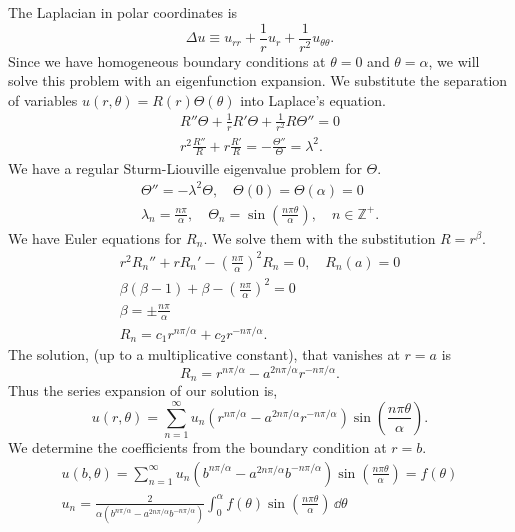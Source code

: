 {%
\begin{Solution}
  \label{solution harmonic sector inhomogeneous bc}
  The Laplacian in polar coordinates is
  \[
  \Delta u \equiv u_{r r} + \frac{1}{r} u_r + \frac{1}{r^2} u_{\theta\theta}.
  \]
  Since we have homogeneous boundary conditions at $\theta = 0$ and 
  $\theta = \alpha$, we will solve this problem with an eigenfunction 
  expansion.  We substitute the separation of variables
  $u(r,\theta) = R(r) \Theta(\theta)$ into Laplace's equation.
  \begin{gather*}
    R'' \Theta + \frac{1}{r} R' \Theta + \frac{1}{r^2} R \Theta'' = 0 \\
    r^2 \frac{R''}{R} + r \frac{R'}{R} = - \frac{\Theta''}{\Theta} = \lambda^2.
  \end{gather*}
  We have a regular Sturm-Liouville eigenvalue problem for $\Theta$.
  \begin{gather*}
    \Theta'' = - \lambda^2 \Theta, \quad \Theta(0) = \Theta(\alpha) = 0
    \\
    \lambda_n = \frac{n \pi}{\alpha}, \quad
    \Theta_n = \sin \left( \frac{n \pi \theta}{\alpha} \right), \quad n \in \mathbb{Z}^+.
  \end{gather*}
  We have Euler equations for $R_n$.  We solve them with the substitution 
  $R = r^\beta$.
  \begin{gather*}
    r^2 R_n'' + r R_n' - \left( \frac{n \pi}{\alpha} \right)^2 R_n = 0, \quad R_n(a) = 0
    \\
    \beta (\beta-1) + \beta - \left( \frac{n \pi}{\alpha} \right)^2 = 0 
    \\
    \beta = \pm \frac{n \pi}{\alpha}
    \\
    R_n = c_1 r^{n \pi / \alpha} + c_2 r^{-n \pi / \alpha}.
  \end{gather*}
  The solution, (up to a multiplicative constant), that vanishes at $r = a$ is
  \[
  R_n = r^{n \pi / \alpha} - a^{2 n \pi / \alpha} r^{-n \pi / \alpha}.
  \]
  Thus the series expansion of our solution is,
  \[
  \boxed{
    u(r,\theta) = \sum_{n=1}^\infty u_n 
    \left( r^{n \pi / \alpha} - a^{2 n \pi / \alpha} r^{-n \pi / \alpha}
    \right) \sin \left( \frac{n \pi \theta}{\alpha} \right).
    }
  \]
  We determine the coefficients from the boundary condition at $r = b$.
  \begin{gather*}
    u(b,\theta) = \sum_{n=1}^\infty u_n \left( b^{n \pi / \alpha} - a^{2 n \pi / \alpha} b^{-n \pi / \alpha} \right) 
    \sin \left( \frac{n \pi \theta}{\alpha} \right) = f(\theta)
    \\
    \boxed{
      u_n = \frac{2}{\alpha \left( b^{n \pi / \alpha} - a^{2 n \pi / \alpha} b^{-n \pi / \alpha} \right)}
      \int_0^\alpha f(\theta) \sin \left( \frac{n \pi \theta}{\alpha} \right) \,\dd \theta
      }
  \end{gather*}
\end{Solution}








}
